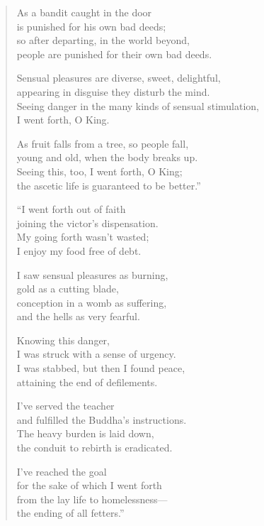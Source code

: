 \documentclass[12pt,openany]{book}%
\begin{document}
\begin{verse}
As a bandit caught in the door \\
is punished for his own bad deeds; \\
so after departing, in the world beyond, \\
people are punished for their own bad deeds. 

Sensual pleasures are diverse, sweet, delightful, \\
appearing in disguise they disturb the mind. \\
Seeing danger in the many kinds of sensual stimulation, \\
I went forth, O King. 

As fruit falls from a tree, so people fall, \\
young and old, when the body breaks up. \\
Seeing this, too, I went forth, O King; \\
the ascetic life is guaranteed to be better.” 

“I went forth out of faith \\
joining the victor’s dispensation. \\
My going forth wasn’t wasted; \\
I enjoy my food free of debt. 

I saw sensual pleasures as burning, \\
gold as a cutting blade, \\
conception in a womb as suffering, \\
and the hells as very fearful. 

Knowing this danger, \\
I was struck with a sense of urgency. \\
I was stabbed, but then I found peace, \\
attaining the end of defilements. 

I’ve served the teacher \\
and fulfilled the Buddha’s instructions. \\
The heavy burden is laid down, \\
the conduit to rebirth is eradicated. 

I’ve reached the goal \\
for the sake of which I went forth \\
from the lay life to homelessness—\\
the ending of all fetters.” 

%
\end{verse}
\end{document}
